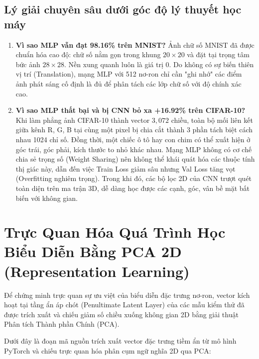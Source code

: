 \documentclass[12pt,a4paper]{report}
\begin{document}
\subsection{Lý giải chuyên sâu dưới góc độ lý thuyết học máy}
\begin{enumerate}
    \item \textbf{Vì sao MLP vẫn đạt 98.16\% trên MNIST?} 
    Ảnh chữ số MNIST đã được chuẩn hóa cao độ: chữ số nằm gọn trong khung $20 \times 20$ và đặt tại trọng tâm bức ảnh $28 \times 28$. Nền xung quanh luôn là giá trị 0. Do không có sự biến thiên vị trí (Translation), mạng MLP với 512 nơ-ron chỉ cần "ghi nhớ" các điểm ảnh phát sáng cố định là đủ để phân tách các lớp chữ số với độ chính xác cao.
    
    \item \textbf{Vì sao MLP thất bại và bị CNN bỏ xa +16.92\% trên CIFAR-10?}
    Khi làm phẳng ảnh CIFAR-10 thành vector $3,072$ chiều, toàn bộ mối liên kết giữa kênh R, G, B tại cùng một pixel bị chia cắt thành 3 phần tách biệt cách nhau 1024 chỉ số. Đồng thời, một chiếc ô tô hay con chim có thể xuất hiện ở góc trái, góc phải, kích thước to nhỏ khác nhau. Mạng MLP không có cơ chế chia sẻ trọng số (Weight Sharing) nên không thể khái quát hóa các thuộc tính thị giác này, dẫn đến việc Train Loss giảm sâu nhưng Val Loss tăng vọt (Overfitting nghiêm trọng). Trong khi đó, các bộ lọc 2D của CNN trượt quét toàn diện trên ma trận 3D, dễ dàng học được các cạnh, góc, vân bề mặt bất biến với không gian.
\end{enumerate}

\section{Trực Quan Hóa Quá Trình Học Biểu Diễn Bằng PCA 2D (Representation Learning)}
Để chứng minh trực quan sự ưu việt của biểu diễn đặc trưng nơ-ron, vector kích hoạt tại tầng ẩn áp chót (Penultimate Latent Layer) của các mẫu kiểm thử đã được trích xuất và chiếu giảm số chiều xuống không gian 2D bằng giải thuật Phân tích Thành phần Chính (PCA).

Dưới đây là đoạn mã nguồn trích xuất vector đặc trưng tiềm ẩn từ mô hình PyTorch và chiếu trực quan hóa phân cụm ngữ nghĩa 2D qua PCA:
\end{document}

